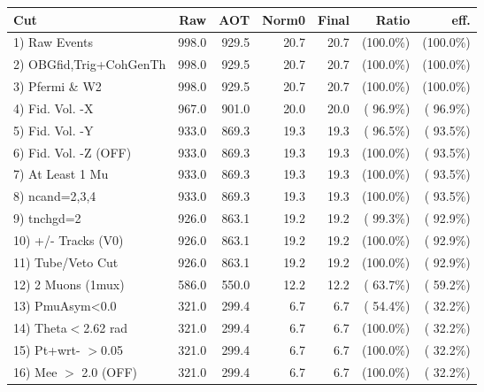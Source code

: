  \begin{table}[h!]\centering
 \begin{tabular}{||l||r|r|r|r|r|r||}
 \hline
 \hline
 Cut & Raw & AOT & Norm0 & Final & Ratio & eff.       \\
 \hline
  1) Raw Events           &        998.0 &        929.5 &         20.7 &         20.7 & (100.0\%) & (100.0\%) \\
  2) OBGfid,Trig+CohGenTh &        998.0 &        929.5 &         20.7 &         20.7 & (100.0\%) & (100.0\%) \\
  3) Pfermi \& W2         &        998.0 &        929.5 &         20.7 &         20.7 & (100.0\%) & (100.0\%) \\
  4) Fid. Vol. -X         &        967.0 &        901.0 &         20.0 &         20.0 & ( 96.9\%) & ( 96.9\%) \\
  5) Fid. Vol. -Y         &        933.0 &        869.3 &         19.3 &         19.3 & ( 96.5\%) & ( 93.5\%) \\
  6) Fid. Vol. -Z (OFF)   &        933.0 &        869.3 &         19.3 &         19.3 & (100.0\%) & ( 93.5\%) \\
  7) At Least 1 Mu        &        933.0 &        869.3 &         19.3 &         19.3 & (100.0\%) & ( 93.5\%) \\
  8) ncand=2,3,4          &        933.0 &        869.3 &         19.3 &         19.3 & (100.0\%) & ( 93.5\%) \\
  9) tnchgd=2             &        926.0 &        863.1 &         19.2 &         19.2 & ( 99.3\%) & ( 92.9\%) \\
 10) +/- Tracks (V0)      &        926.0 &        863.1 &         19.2 &         19.2 & (100.0\%) & ( 92.9\%) \\
 11) Tube/Veto Cut        &        926.0 &        863.1 &         19.2 &         19.2 & (100.0\%) & ( 92.9\%) \\
 12) 2 Muons (1mux)       &        586.0 &        550.0 &         12.2 &         12.2 & ( 63.7\%) & ( 59.2\%) \\
 13) PmuAsym<0.0          &        321.0 &        299.4 &          6.7 &          6.7 & ( 54.4\%) & ( 32.2\%) \\
 14) Theta$<$2.62 rad     &        321.0 &        299.4 &          6.7 &          6.7 & (100.0\%) & ( 32.2\%) \\
 15) Pt+wrt- $>$0.05      &        321.0 &        299.4 &          6.7 &          6.7 & (100.0\%) & ( 32.2\%) \\
 16) Mee $>$ 2.0  (OFF)   &        321.0 &        299.4 &          6.7 &          6.7 & (100.0\%) & ( 32.2\%) \\

\end{tabular}
\end{table}
